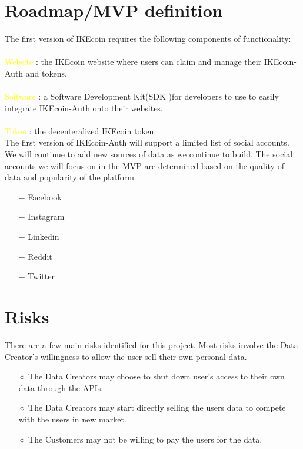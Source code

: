 \documentclass[12pt, letterpaper, twoside]{article}
\begin{document}
\section{Roadmap/MVP definition}
The first version of IKEcoin requires the following components of functionality:
\\
\\
\textcolor{yellow}{Website} : the IKEcoin website where users can claim and manage their IKEcoin-Auth and tokens.
\\
\\
\textcolor{yellow}{Software} : a Software Development Kit(SDK )for developers to use to easily integrate IKEcoin-Auth onto their websites.
\\
\\
\textcolor{yellow}{Token} : the decenteralized IKEcoin token. \\


The first version of IKEcoin-Auth will support a limited list of social accounts. We will continue to add new sources of data as we continue to build. The social accounts we will focus on in the MVP are determined based on the quality of data and popularity of the platform. 
\begin{itemize}
  \setlength{\itemsep}{1pt}
  \setlength{\parskip}{0pt}
  \setlength{\parsep}{0pt}
  \item[$-$] Facebook
  \item[$-$] Instagram
  \item[$-$] Linkedin
  \item[$-$] Reddit
  \item[$-$] Twitter
\end{itemize}

\section{Risks}
There are a few main risks identified for this project. Most risks involve the Data Creator's willingness to allow the user sell their own personal data.
\begin{itemize}
  \setlength{\itemsep}{1pt}
  \setlength{\parskip}{0pt}
  \setlength{\parsep}{0pt}
  \item[$\diamond$]  The Data Creators may  choose to shut down user’s access to their own data through the APIs.
  \item[$\diamond$]  The Data Creators may start directly selling the users data to compete with the users in new market.
  \item[$\diamond$]  The Customers may not be willing to pay the users for the data.
\end{itemize}
\end{document}
